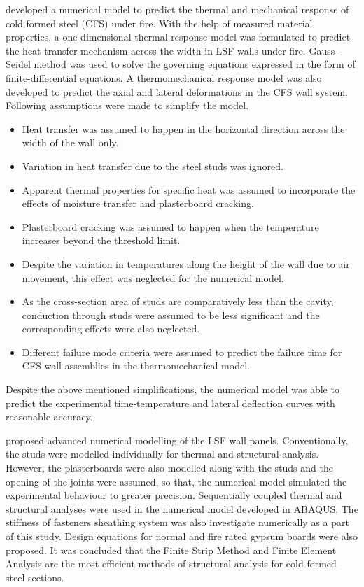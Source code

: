 \citet{Chen2014} developed a numerical model to predict the thermal and mechanical response of cold formed steel (CFS) under fire. With the help of measured material properties, a one dimensional thermal response model was formulated to predict the heat transfer mechanism across the width in LSF walls under fire. Gauss-Seidel method was used to solve the governing equations expressed in the form of finite-differential equations. A thermomechanical response model was also developed to predict the axial and lateral deformations in the CFS wall system. Following assumptions were made to simplify the model.
\begin{itemize}
	\item Heat transfer was assumed to happen in the horizontal direction across the width of the wall only. 
	\item Variation in heat transfer due to the steel studs was ignored.
	\item Apparent thermal properties for specific heat was assumed to incorporate the effects of moisture transfer and plasterboard cracking.
	\item Plasterboard cracking was assumed to happen when the temperature increases beyond the threshold limit.
	\item Despite the variation in temperatures along the height of the wall due to air movement, this effect was neglected for the numerical model.
	\item As the cross-section area of studs are comparatively less than the cavity, conduction through studs were assumed to be less significant and the corresponding effects were also neglected.
	\item Different failure mode criteria were assumed to predict the failure time for CFS wall assemblies in the thermomechanical model.    
\end{itemize}
Despite the above mentioned simplifications, the numerical model was able to predict the experimental time-temperature and lateral deflection curves with reasonable accuracy. 

\citet{BatistaAbreu2015} proposed advanced numerical modelling of the LSF wall panels. Conventionally, the studs were modelled individually for thermal and structural analysis. However, the plasterboards were also modelled along with the studs and the opening of the joints were assumed, so that, the numerical model simulated the experimental behaviour to greater precision. Sequentially coupled thermal and structural analyses were used in the numerical model developed in ABAQUS. The stiffness of fasteners sheathing system was also investigate numerically as a part of this study. Design equations for normal and fire rated gypsum boards were also proposed. It was concluded that the Finite Strip Method and Finite Element Analysis are the most efficient methods of structural analysis for cold-formed steel sections.  


